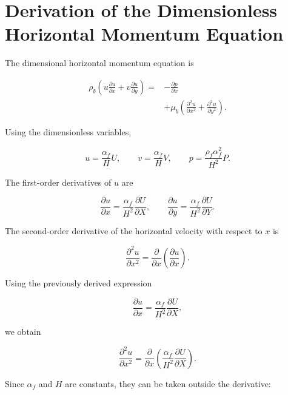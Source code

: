 \documentclass[preprint,3p,number]{elsarticle}
\begin{document}
\section{Derivation of the Dimensionless Horizontal Momentum Equation}

The dimensional horizontal momentum equation is

\begin{equation}
\begin{aligned}
\rho_b
\left(
u\frac{\partial u}{\partial x}
+
v\frac{\partial u}{\partial y}
\right)
={}&-\frac{\partial p}{\partial x}\\
&+\mu_b
\left(
\frac{\partial^2u}{\partial x^2}
+
\frac{\partial^2u}{\partial y^2}
\right).
\end{aligned}
\label{eq:horizontal_start}
\end{equation}

Using the dimensionless variables,

\begin{equation}
u=\frac{\alpha_f}{H}U,
\qquad
v=\frac{\alpha_f}{H}V,
\qquad
p=\frac{\rho_f\alpha_f^2}{H^2}P.
\label{eq:horizontal_variables}
\end{equation}

The first-order derivatives of \(u\) are

\begin{equation}
\frac{\partial u}{\partial x}
=
\frac{\alpha_f}{H^2}
\frac{\partial U}{\partial X},
\qquad
\frac{\partial u}{\partial y}
=
\frac{\alpha_f}{H^2}
\frac{\partial U}{\partial Y}.
\label{eq:horizontal_first_derivatives}
\end{equation}

The second-order derivative of the horizontal velocity with respect to \(x\) is

\[
\frac{\partial^2 u}{\partial x^2}
=
\frac{\partial}{\partial x}
\left(\frac{\partial u}{\partial x}\right).
\]

Using the previously derived expression

\[
\frac{\partial u}{\partial x}
=
\frac{\alpha_f}{H^2}
\frac{\partial U}{\partial X},
\]

we obtain

\[
\frac{\partial^2 u}{\partial x^2}
=
\frac{\partial}{\partial x}
\left(
\frac{\alpha_f}{H^2}
\frac{\partial U}{\partial X}
\right).
\]

Since \(\alpha_f\) and \(H\) are constants, they can be taken outside the derivative:
\end{document}

